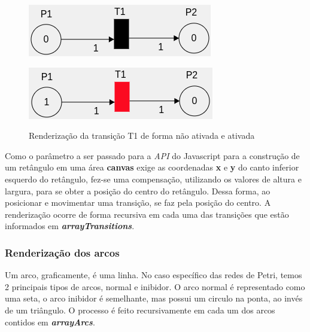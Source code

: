 \documentclass[
	12pt,				%
	openright,			%
	oneside,			%
	a4paper,			%
	english,			%
	brazil				%
	]{abntex2}
\begin{document}
\begin{figure}[ht]
	\label{fig:renderTransition}
	\centering
	\begin{minipage}{0.5\textwidth}
		\centering
		\includegraphics[scale=1]{figuras/transitionEnableFalse.png}
		\label{fig:renderTransitionEnableFalse}
	\end{minipage}
	\hfill
	\begin{minipage}{0.5\textwidth}
		\centering
		\includegraphics[scale=1]{figuras/transitionEnableTrue.png}
		\label{fig:renderTransitionEnableTrue}
	\end{minipage}
	\caption{Renderização da transição T1 de forma não ativada e ativada}
\end{figure}

Como o parâmetro a ser passado para a \textit{API} do Javascript para a construção de um retângulo em uma área \textbf{canvas} exige as coordenadas \textbf{x} e \textbf{y} do canto inferior esquerdo do retângulo, fez-se uma compensação, utilizando os valores de altura e largura, para se obter a posição do centro do retângulo. Dessa forma, ao posicionar e movimentar uma transição, se faz pela posição do centro.  A renderização ocorre de forma recursiva em cada uma das transições que estão informados em \textbf{\textit{arrayTransitions}}.

\subsubsection*{Renderização dos arcos}

Um arco, graficamente, é uma linha. No caso específico das redes de Petri, temos 2 principais tipos de arcos, normal e inibidor. O arco normal é representado como uma seta, o arco inibidor é semelhante, mas possui um circulo na ponta, ao invés de um triângulo. O processo é feito recursivamente em cada um dos arcos contidos em \textbf{\textit{arrayArcs}}.
\end{document}
